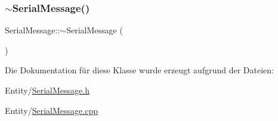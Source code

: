 \hypertarget{class_serial_message_a9bcc2b473a850ca82bf139a9fee6debb}{}\label{class_serial_message_a9bcc2b473a850ca82bf139a9fee6debb} 
\subsubsection{\texorpdfstring{$\sim$\+Serial\+Message()}{~SerialMessage()}}
{\footnotesize\ttfamily Serial\+Message\+::$\sim$\+Serial\+Message (\begin{DoxyParamCaption}{ }\end{DoxyParamCaption})\hspace{0.3cm}{\ttfamily [virtual]}}



Die Dokumentation für diese Klasse wurde erzeugt aufgrund der Dateien\+:\begin{DoxyCompactItemize}
\item 
Entity/\hyperlink{_serial_message_8h}{Serial\+Message.\+h}\item 
Entity/\hyperlink{_serial_message_8cpp}{Serial\+Message.\+cpp}\end{DoxyCompactItemize}
